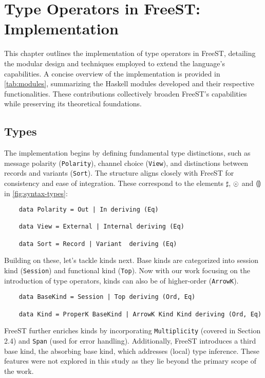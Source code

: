 \chapter{Type Operators in FreeST: Implementation}

This chapter outlines the implementation of type operators in FreeST, detailing the modular design and techniques employed to extend the language's capabilities. A concise overview of the implementation is provided in \cref*{tab:modules}, summarizing the Haskell modules developed and their respective functionalities. These contributions collectively broaden FreeST's capabilities while preserving its theoretical foundations.
\\



\section{Types}
The implementation begins by defining fundamental type distinctions, such as message polarity (\lstinline|Polarity|), channel choice (\lstinline|View|), and distinctions between records and variants (\lstinline|Sort|). The structure aligns closely with FreeST for consistency and ease of integration. These correspond to the elements $\sharp$, $\odot$ and $\llparenthesis{}\rrparenthesis$ in \cref*{fig:syntax-types}:\

\begin{lstlisting}
    data Polarity = Out | In deriving (Eq)

    data View = External | Internal deriving (Eq)

    data Sort = Record | Variant  deriving (Eq)
\end{lstlisting}
Building on these, let's tackle kinds next. Base kinds are categorized into session kind (\lstinline|Session|) and functional kind (\lstinline|Top|). Now with our work focusing on the introduction of type operators, kinds can also be of higher-order (\lstinline|ArrowK|).

\begin{lstlisting}
    data BaseKind = Session | Top deriving (Ord, Eq) 

    data Kind = ProperK BaseKind | ArrowK Kind Kind deriving (Ord, Eq)
\end{lstlisting}
FreeST further enriches kinds by incorporating \lstinline|Multiplicity| (covered in Section 2.4) and \lstinline|Span| (used for error handling). Additionally, FreeST introduces a third base kind, the absorbing base kind, which addresses (local) type inference. These features were not explored in this study as they lie beyond the primary scope of the work.


